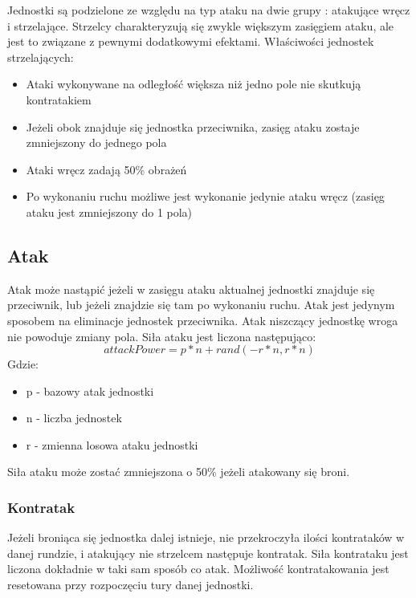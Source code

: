 \documentclass[letterpaper,12pt]{article}
\begin{document}
Jednostki są podzielone ze względu na typ ataku na dwie grupy : atakujące wręcz i strzelające. Strzelcy charakteryzują się zwykle większym zasięgiem ataku, ale jest to związane z pewnymi dodatkowymi efektami. Właściwości jednostek strzelających:

\begin{itemize}
\item Ataki wykonywane na odległość większa niż jedno pole nie skutkują kontratakiem
\item Jeżeli obok znajduje się jednostka przeciwnika, zasięg ataku zostaje zmniejszony do jednego pola
\item Ataki wręcz zadają 50\% obrażeń
\item Po wykonaniu ruchu możliwe jest wykonanie jedynie ataku wręcz (zasięg ataku jest zmniejszony do 1 pola)
\end{itemize}

\subsection{Atak}

Atak może nastąpić jeżeli w zasięgu ataku aktualnej jednostki znajduje się przeciwnik, lub jeżeli znajdzie się tam po wykonaniu ruchu. Atak jest jedynym sposobem na eliminacje jednostek przeciwnika. Atak niszczący jednostkę wroga nie powoduje zmiany pola. Siła ataku jest liczona następująco:
\begin{equation}
attackPower =  p*n + rand(-r*n,r*n)
\end{equation}
Gdzie:
\begin{itemize}
\item p - bazowy atak jednostki
\item n - liczba jednostek
\item r - zmienna losowa ataku jednostki
\end{itemize}

Siła ataku może zostać zmniejszona o 50\% jeżeli atakowany się broni.

\subsubsection {Kontratak}

Jeżeli broniąca się jednostka dalej istnieje, nie przekroczyła ilości kontrataków w danej rundzie, i atakujący nie strzelcem następuje kontratak. Siła kontrataku jest liczona dokładnie w taki sam sposób co atak. Możliwość kontratakowania jest resetowana przy rozpoczęciu tury danej jednostki.
\end{document}
